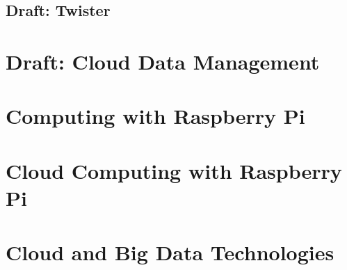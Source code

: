 \documentclass{format/laszewski}
\begin{document}


\chapter{Draft: Twister}
\label{c:twister}





\part{Draft: Cloud Data Management}


%


\part{Computing with Raspberry Pi}



\part{Cloud Computing with Raspberry Pi}














\part{Cloud and Big Data Technologies}







\end{document}
